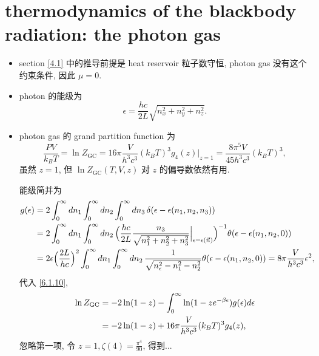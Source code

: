\section{thermodynamics of the blackbody radiation: the photon gas} \label{7.3}
\begin{itemize}
	\item section \ref{4.1} 中的推导前提是 heat reservoir 粒子数守恒, photon gas 没有这个约束条件, 因此 $\mu = 0$.
	
	\item photon 的能级为
	\begin{equation}
		\epsilon = \frac{h c}{2 L} \sqrt{n_x^2 + n_y^2 + n_z^2}.
	\end{equation}
	
	\item photon gas 的 grand partition function 为
	\begin{equation}
		\frac{P V}{k_B T} = \ln Z_\text{GC} = 16 \pi \frac{V}{h^3 c^3} (k_B T)^3 g_4(z) \Big|_{z = 1} = \frac{8 \pi^5 V}{45 h^3 c^3} (k_B T)^3,
	\end{equation}
	虽然 $z = 1$, 但 $\ln Z_\text{GC}(T, V, z)$ 对 $z$ 的偏导数依然有用.
	
	\begin{tcolorbox}[title=calculation:]
		能级简并为
		\begin{align}
			g(\epsilon) &= 2 \int_0^\infty dn_1 \int_0^\infty dn_2 \int_0^\infty dn_3 \, \delta(\epsilon - \epsilon(n_1, n_2, n_3)) \notag \\
			&= 2 \int_0^\infty dn_1 \int_0^\infty dn_2 \, \Big( \frac{h c}{2 L} \frac{n_3}{\sqrt{n_1^2 + n_2^2 + n_3^2}} \Big|_{\epsilon = \epsilon(\vec{n})} \Big)^{- 1} \theta(\epsilon - \epsilon(n_1, n_2, 0)) \notag \\
			&= 2 \epsilon \Big( \frac{2 L}{h c} \Big)^2 \int_0^\infty dn_1 \int_0^\infty dn_2 \, \frac{1}{\sqrt{n_\epsilon^2 - n_1^2 - n_2^2}} \theta(\epsilon - \epsilon(n_1, n_2, 0)) = 8 \pi \frac{V}{h^3 c^3} \epsilon^2,
		\end{align}
		代入 \eqref{6.1.10},
		\begin{align}
			\ln Z_\text{GC} &= - 2 \ln(1 - z) - \int_0^\infty \ln(1 - z e^{- \beta \epsilon}) g(\epsilon) d\epsilon \notag \\
			&= - 2 \ln(1 - z) + 16 \pi \frac{V}{h^3 c^3} (k_B T)^3 g_4(z),
		\end{align}
		忽略第一项, 令 $z = 1, \zeta(4) = \frac{\pi^4}{90}$, 得到...
	\end{tcolorbox}
	

\end{itemize}
